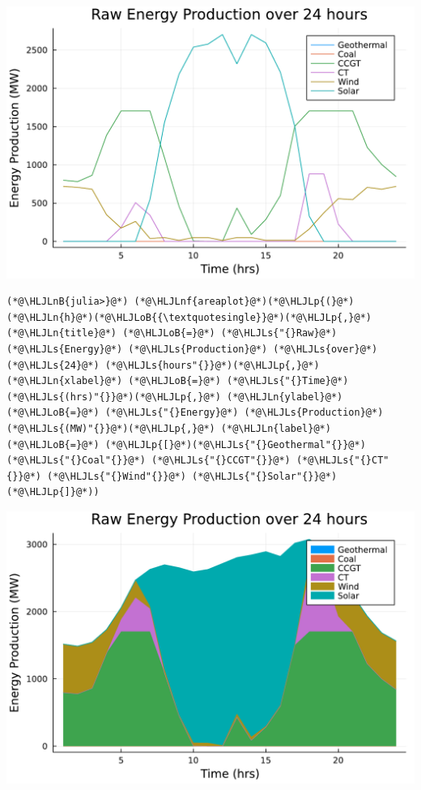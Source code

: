 \documentclass[12pt,a4paper]{article}
\newcommand{\HLJLn}[1]{#1}
\newcommand{\HLJLnf}[1]{\textcolor[RGB]{66,102,213}{#1}}
\newcommand{\HLJLs}[1]{\textcolor[RGB]{201,61,57}{#1}}
\newcommand{\HLJLnB}[1]{\textcolor[RGB]{59,151,46}{#1}}
\newcommand{\HLJLoB}[1]{\textcolor[RGB]{102,102,102}{\textbf{#1}}}
\newcommand{\HLJLp}[1]{#1}
\begin{document}
\includegraphics[width=\linewidth]{figures/solution-template_5_1.pdf}

\begin{lstlisting}
(*@\HLJLnB{julia>}@*) (*@\HLJLnf{areaplot}@*)(*@\HLJLp{(}@*)(*@\HLJLn{h}@*)(*@\HLJLoB{{\textquotesingle}}@*)(*@\HLJLp{,}@*)(*@\HLJLn{title}@*) (*@\HLJLoB{=}@*) (*@\HLJLs{"{}Raw}@*) (*@\HLJLs{Energy}@*) (*@\HLJLs{Production}@*) (*@\HLJLs{over}@*) (*@\HLJLs{24}@*) (*@\HLJLs{hours"{}}@*)(*@\HLJLp{,}@*) (*@\HLJLn{xlabel}@*) (*@\HLJLoB{=}@*) (*@\HLJLs{"{}Time}@*) (*@\HLJLs{(hrs)"{}}@*)(*@\HLJLp{,}@*) (*@\HLJLn{ylabel}@*) (*@\HLJLoB{=}@*) (*@\HLJLs{"{}Energy}@*) (*@\HLJLs{Production}@*) (*@\HLJLs{(MW)"{}}@*)(*@\HLJLp{,}@*) (*@\HLJLn{label}@*)(*@\HLJLoB{=}@*) (*@\HLJLp{[}@*)(*@\HLJLs{"{}Geothermal"{}}@*) (*@\HLJLs{"{}Coal"{}}@*) (*@\HLJLs{"{}CCGT"{}}@*) (*@\HLJLs{"{}CT"{}}@*) (*@\HLJLs{"{}Wind"{}}@*) (*@\HLJLs{"{}Solar"{}}@*)(*@\HLJLp{]}@*))
\end{lstlisting}
\includegraphics[width=\linewidth]{figures/solution-template_5_2.pdf}
\end{document}

